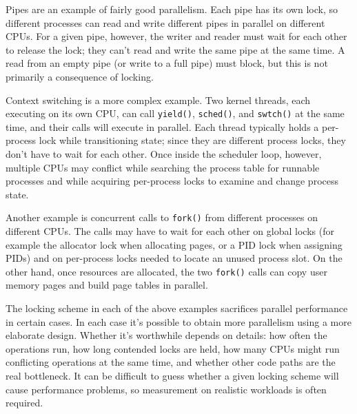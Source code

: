 Pipes are an example of fairly good parallelism. Each pipe has its own lock, so
different processes can read and write different pipes in parallel on different
CPUs. For a given pipe, however, the writer and reader must wait for each other
to release the lock; they can't read and write the same pipe at the same time.
A read from an empty pipe (or write to a full pipe) must block, but this is not
primarily a consequence of locking.

Context switching is a more complex example. Two kernel threads, each executing
on its own CPU, can call \lstinline{yield()}, \lstinline{sched()}, and
\lstinline{swtch()} at the same time, and their calls will execute in parallel.
Each thread typically holds a per-process lock while transitioning state; since
they are different process locks, they don't have to wait for each other.
Once inside the scheduler loop, however, multiple CPUs may conflict while
searching the process table for runnable processes and while acquiring per-process
locks to examine and change process state.

Another example is concurrent calls to \lstinline{fork()} from different
processes on different CPUs. The calls may have to wait for each other on global
locks (for example the allocator lock when allocating pages, or a PID lock when
assigning PIDs) and on per-process locks needed to locate an unused process
slot. On the other hand, once resources are allocated, the two \lstinline{fork()}
calls can copy user memory pages and build page tables in parallel.

The locking scheme in each of the above examples sacrifices parallel performance
in certain cases. In each case it's possible to obtain more parallelism using a
more elaborate design. Whether it's worthwhile depends on details: how often the
operations run, how long contended locks are held, how many CPUs might run
conflicting operations at the same time, and whether other code paths are the
real bottleneck. It can be difficult to guess whether a given locking scheme
will cause performance problems, so measurement on realistic workloads is often
required.

